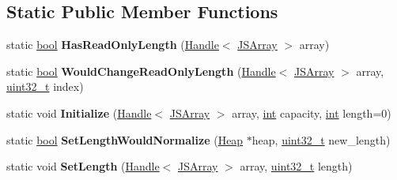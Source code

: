 \subsection*{Static Public Member Functions}
\begin{DoxyCompactItemize}
\item 
\mbox{\label{classv8_1_1internal_1_1JSArray_a0ebad386294cd7ba5e09f1289f84b23b}} 
static \mbox{\hyperlink{classbool}{bool}} {\bfseries Has\+Read\+Only\+Length} (\mbox{\hyperlink{classv8_1_1internal_1_1Handle}{Handle}}$<$ \mbox{\hyperlink{classv8_1_1internal_1_1JSArray}{J\+S\+Array}} $>$ array)
\item 
\mbox{\label{classv8_1_1internal_1_1JSArray_ab250b04720a407005395098e350026f5}} 
static \mbox{\hyperlink{classbool}{bool}} {\bfseries Would\+Change\+Read\+Only\+Length} (\mbox{\hyperlink{classv8_1_1internal_1_1Handle}{Handle}}$<$ \mbox{\hyperlink{classv8_1_1internal_1_1JSArray}{J\+S\+Array}} $>$ array, \mbox{\hyperlink{classuint32__t}{uint32\+\_\+t}} index)
\item 
\mbox{\label{classv8_1_1internal_1_1JSArray_ac34bb2e7768e194e679b3b1556b4e168}} 
static void {\bfseries Initialize} (\mbox{\hyperlink{classv8_1_1internal_1_1Handle}{Handle}}$<$ \mbox{\hyperlink{classv8_1_1internal_1_1JSArray}{J\+S\+Array}} $>$ array, \mbox{\hyperlink{classint}{int}} capacity, \mbox{\hyperlink{classint}{int}} length=0)
\item 
\mbox{\label{classv8_1_1internal_1_1JSArray_aceeca4831590d83fe633b9471936e78e}} 
static \mbox{\hyperlink{classbool}{bool}} {\bfseries Set\+Length\+Would\+Normalize} (\mbox{\hyperlink{classv8_1_1internal_1_1Heap}{Heap}} $\ast$heap, \mbox{\hyperlink{classuint32__t}{uint32\+\_\+t}} new\+\_\+length)
\item 
\mbox{\label{classv8_1_1internal_1_1JSArray_a393d220b4a4df41af5589d3c3774281b}} 
static void {\bfseries Set\+Length} (\mbox{\hyperlink{classv8_1_1internal_1_1Handle}{Handle}}$<$ \mbox{\hyperlink{classv8_1_1internal_1_1JSArray}{J\+S\+Array}} $>$ array, \mbox{\hyperlink{classuint32__t}{uint32\+\_\+t}} length)
\item 
\mbox{\label{classv8_1_1internal_1_1JSArray_a41f6ed171dd4166868145bfbd59ae829}} 

\end{DoxyCompactItemize}
